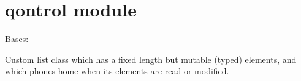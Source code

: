\documentclass[letterpaper,10pt,english]{sphinxmanual}
\begin{document}
\section{qontrol module}
\label{\detokenize{qontrol:qontrol-module}}\label{\detokenize{qontrol::doc}}\label{\detokenize{qontrol:module-qontrol}}

\begin{fulllineitems}
\label{\detokenize{qontrol:qontrol.ChannelVector}}
Bases: 

Custom list class which has a fixed length but mutable (typed) elements, and which phones home when its elements are read or modified.

\begin{fulllineitems}
\label{\detokenize{qontrol:qontrol.ChannelVector.get_handle}}
\end{fulllineitems}


\begin{fulllineitems}
\label{\detokenize{qontrol:qontrol.ChannelVector.set_handle}}
\end{fulllineitems}


\begin{fulllineitems}
\label{\detokenize{qontrol:qontrol.ChannelVector.valid_types}}
\end{fulllineitems}


\end{fulllineitems}

\end{document}
